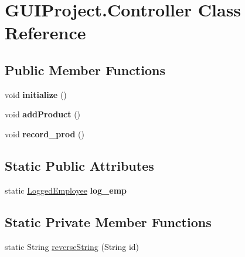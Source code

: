 \hypertarget{class_g_u_i_project_1_1_controller}{}\section{G\+U\+I\+Project.\+Controller Class Reference}
\label{class_g_u_i_project_1_1_controller}
\subsection*{Public Member Functions}
\begin{DoxyCompactItemize}
\item 
\mbox{\label{class_g_u_i_project_1_1_controller_a562ec709b826ba7bd1b60f7515e30171}} 
void {\bfseries initialize} ()
\item 
\mbox{\label{class_g_u_i_project_1_1_controller_a0195ddf55ce4ec92ff186d5c6244ffd1}} 
void {\bfseries add\+Product} ()
\item 
\mbox{\label{class_g_u_i_project_1_1_controller_a0294cce1226a2daa3d7de83473e1c9f9}} 
void {\bfseries record\+\_\+prod} ()
\end{DoxyCompactItemize}
\subsection*{Static Public Attributes}
\begin{DoxyCompactItemize}
\item 
\mbox{\label{class_g_u_i_project_1_1_controller_a0d273a89b1599023a32a889df1dde2f0}} 
static \mbox{\hyperlink{class_g_u_i_project_1_1_logged_employee}{Logged\+Employee}} {\bfseries log\+\_\+emp}
\end{DoxyCompactItemize}
\subsection*{Static Private Member Functions}
\begin{DoxyCompactItemize}
\item 
static String \mbox{\hyperlink{class_g_u_i_project_1_1_controller_aa2699a52331ff1977530bcaa3eaf656e}{reverse\+String}} (String id)
\end{DoxyCompactItemize}
